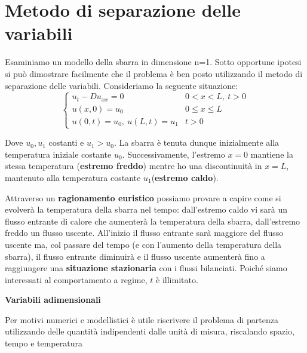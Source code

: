 \documentclass[10pt,a4paper,twoside,openright]{book}
\begin{document}
\section{Metodo di separazione delle variabili}

Esaminiamo un modello della sbarra in dimensione n=1. Sotto opportune ipotesi si può dimostrare facilmente che il problema è ben posto utilizzando il metodo di separazione delle variabili. Consideriamo la seguente situazione:
\begin{equation*}
\begin{cases}
u_{t} -Du_{xx} =0 & 0< x< L,\ t >0\\
u(x,0) =u_{0} & 0\leqslant x\leqslant L\\
u(0,t) =u_{0},\ u(L,t) =u_{1} & t >0
\end{cases}
\end{equation*}

Dove $\displaystyle u_{0},u_{1}$ costanti e $\displaystyle u_{1}  >u_{0}$. La sbarra è tenuta dunque inizialmente alla temperatura iniziale costante $\displaystyle u_{0}$. Successivamente, l'estremo $\displaystyle x=0$ mantiene la stessa temperatura (\textbf{estremo freddo}) mentre ho una discontinuità in $\displaystyle x=L$, mantenuto alla temperatura costante $\displaystyle u_{1}$(\textbf{estremo caldo}).

Attraverso un \textbf{ragionamento euristico} possiamo provare a capire come si evolverà la temperatura della sbarra nel tempo: dall'estremo caldo vi sarà un flusso entrante di calore che aumenterà la temperatura della sbarra, dall'estremo freddo un flusso uscente. All'inizio il flusso entrante sarà maggiore del flusso uscente ma, col passare del tempo (e con l'aumento della temperatura della sbarra), il flusso entrante diminuirà e il flusso uscente aumenterà fino a raggiungere una \textbf{situazione stazionaria} con i flussi bilanciati. Poiché siamo interessati al comportamento a regime, $t$ è illimitato.



\textbf{Variabili adimensionali}

Per motivi numerici e modellistici è utile riscrivere il problema di partenza utilizzando delle quantità indipendenti dalle unità di misura, riscalando spazio, tempo e temperatura
\end{document}
